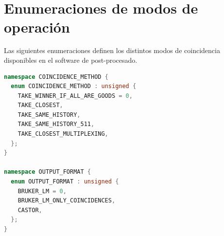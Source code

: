 \section{Enumeraciones de modos de operación}

Las siguientes enumeraciones definen los distintos modos de coincidencia disponibles en el software de post-procesado.

\begin{lstlisting}[language=C++, caption={Enumeraciones de los modos de coincidencia y formatos de salida.}, label={lst:enums_annex}]
namespace COINCIDENCE_METHOD {
  enum COINCIDENCE_METHOD : unsigned {
    TAKE_WINNER_IF_ALL_ARE_GOODS = 0,
    TAKE_CLOSEST,
    TAKE_SAME_HISTORY,
    TAKE_SAME_HISTORY_511,
    TAKE_CLOSEST_MULTIPLEXING,
  };
}

namespace OUTPUT_FORMAT {
  enum OUTPUT_FORMAT : unsigned {
    BRUKER_LM = 0,
    BRUKER_LM_ONLY_COINCIDENCES,
    CASTOR,
  };
}
\end{lstlisting}
